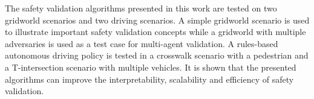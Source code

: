 The safety validation algorithms presented in this work are tested on two gridworld scenarios and two driving scenarios. A simple gridworld scenario is used to illustrate important safety validation concepts while a gridworld with multiple adversaries is used as a test case for multi-agent validation. A rules-based autonomous driving policy is tested in a crosswalk scenario with a pedestrian and a T-intersection scenario with multiple vehicles. It is shown that the presented algorithms can improve the interpretability, scalability and efficiency of safety validation.